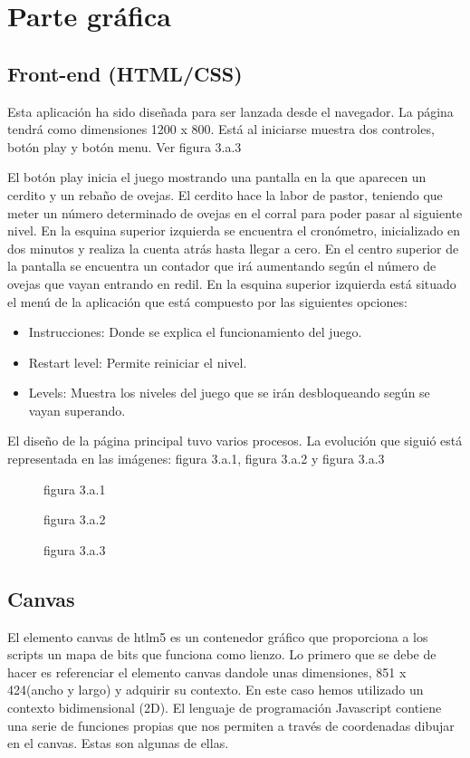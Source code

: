\section{Parte gráfica}
\label{chap:grafica}

\subsection{Front-end (HTML/CSS)}
\label{sec:front_end}

Esta aplicación ha sido diseñada para ser lanzada desde el navegador. La página tendrá como dimensiones 1200 x 800. Está al iniciarse muestra dos controles, botón play y botón menu.
Ver figura 3.a.3

El botón play inicia el juego mostrando una pantalla en la que aparecen un cerdito y un rebaño de ovejas. El cerdito hace la labor de pastor, teniendo que meter un número determinado de ovejas en el corral para poder pasar al siguiente nivel. 
En la esquina superior izquierda se encuentra el cronómetro, inicializado en dos minutos y realiza la cuenta atrás hasta llegar a cero.
En el centro superior de la pantalla se encuentra un contador que irá aumentando según el número de ovejas que vayan entrando en redil.
En la esquina superior izquierda está situado el menú de la aplicación que está compuesto por las siguientes opciones:
\begin{itemize}
 \item Instrucciones: Donde se explica el funcionamiento del juego.
 \item Restart level: Permite reiniciar el nivel.
 \item Levels: Muestra los niveles del juego que se irán desbloqueando según se vayan superando.
\end{itemize}

El diseño de la página principal tuvo varios procesos. La evolución que siguió está representada en las imágenes: figura 3.a.1, figura 3.a.2 y figura 3.a.3 

\begin{figure}
figura 3.a.1

figura 3.a.2

figura 3.a.3
\end{figure}


\subsection{Canvas}
\label{sec:canvas}

El elemento canvas  de htlm5 es un contenedor gráfico que  proporciona a los scripts  un mapa de bits  que funciona como lienzo.
Lo primero que se debe de hacer es referenciar el elemento canvas dandole unas dimensiones, 851 x 424(ancho y largo) y adquirir su contexto.
En este caso hemos utilizado un contexto bidimensional (2D).
El lenguaje de programación Javascript contiene una serie de funciones propias que nos permiten  a través de coordenadas dibujar en el canvas.
Estas son algunas de ellas.

